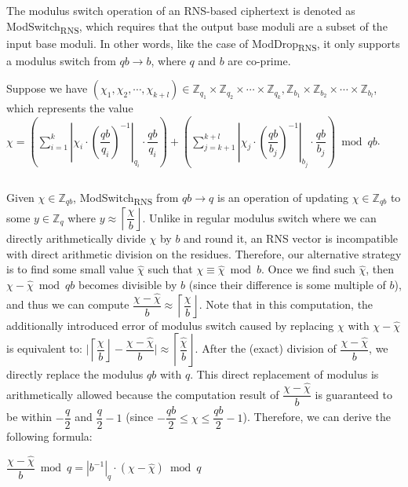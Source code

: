 The modulus switch operation of an RNS-based ciphertext is denoted as \textsf{ModSwitch\textsubscript{RNS}}, which requires that the output base moduli are a subset of the input base moduli. In other words, like the case of \textsf{ModDrop\textsubscript{RNS}}, it only supports a modulus switch from $qb \rightarrow b$, where $q$ and $b$ are co-prime. 


Suppose we have $(\chi_1, \chi_2, \cdots, \chi_{k+l}) \in \mathbb{Z}_{q_1} \times \mathbb{Z}_{q_2} \times \cdots \times \mathbb{Z}_{q_k}, \mathbb{Z}_{b_1} \times \mathbb{Z}_{b_2} \times \cdots \times \mathbb{Z}_{b_l} $, which represents the value $\chi = \left(\sum\limits_{i=1}^{k}\left|\chi_i\cdot\left(\dfrac{qb}{q_i}\right)^{-1}\right|_{q_i}\cdot\dfrac{qb}{q_i}\right) + \left(\sum\limits_{j=k+1}^{k+l}\left|\chi_j\cdot\left(\dfrac{qb}{b_j}\right)^{-1}\right|_{b_j}\cdot\dfrac{qb}{b_j}\right) \bmod qb$. 

$ $

Given $\chi \in \mathbb{Z}_{qb}$, \textsf{ModSwitch\textsubscript{RNS}} from $qb \rightarrow q$ is an operation of updating $\chi \in \mathbb{Z}_{qb}$ to some $y \in \mathbb{Z}_q$ where $y \approx \left\lceil\dfrac{\chi}{b}\right\rfloor$. Unlike in regular modulus switch where we can directly arithmetically divide $\chi$ by $b$ and round it, an RNS vector is incompatible with direct arithmetic division on the residues. Therefore, our alternative strategy is to find some small value $\hat{\chi}$ such that $\chi \equiv \hat{\chi} \bmod b$. Once we find such $\hat\chi$, then $\chi - \hat{\chi} \bmod qb$ becomes divisible by $b$ (since their difference is some multiple of $b$), and thus we can compute $\dfrac{\chi - \hat{\chi}}{b} \approx \left\lceil\dfrac{\chi}{b}\right\rfloor$. Note that in this computation, the additionally introduced error of modulus switch caused by replacing $\chi$ with $\chi - \hat\chi$ is equivalent to: $\Bigg|\left\lceil\dfrac{\chi}{b}\right\rfloor - \dfrac{\chi - \hat\chi}{b}\Bigg| \approx \left\lceil\dfrac{\hat\chi}{b}\right\rfloor$. After the (exact) division of $\dfrac{\chi - \hat\chi}{b}$, we directly replace the modulus $qb$ with $q$. This direct replacement of modulus is arithmetically allowed because the computation result of $\dfrac{\chi - \hat{\chi}}{b}$ is guaranteed to be within $-\dfrac{q}{2}$ and $\dfrac{q}{2} -1$ (since $-\dfrac{qb}{2}\leq \chi \leq \dfrac{qb}{2}-1$). Therefore, we can derive the following formula:

$\dfrac{\chi - \hat{\chi}}{b} \bmod q = |b^{-1}|_{q}\cdot (\chi - \hat{\chi}) \bmod q$  %

